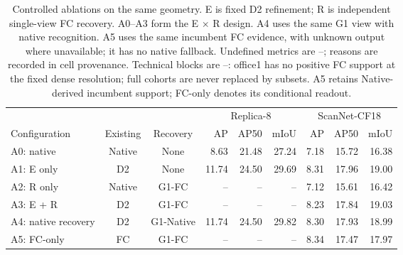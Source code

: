 \begin{table}[!ht]
\centering
\caption{Controlled ablations on the same geometry. E is fixed D2 refinement; R is independent single-view FC recovery. A0--A3 form the E $\times$ R design. A4 uses the same G1 view with native recognition. A5 uses the same incumbent FC evidence, with unknown output where unavailable; it has no native fallback. Undefined metrics are --; reasons are recorded in cell provenance. Technical blocks are --: office1 has no positive FC support at the fixed dense resolution; full cohorts are never replaced by subsets. A5 retains Native-derived incumbent support; FC-only denotes its conditional readout.}
\label{tab:ablation}
\fontsize{9}{10.5}\selectfont
\setlength{\tabcolsep}{4pt}
\begin{tabular*}{\textwidth}{@{\extracolsep{\fill}}lccrrrrrr@{}}
\toprule
& & & \multicolumn{3}{c}{Replica-8} & \multicolumn{3}{c}{ScanNet-CF18} \\
\cmidrule(lr){4-6}\cmidrule(l){7-9}
Configuration & Existing & Recovery & AP & AP50 & mIoU & AP & AP50 & mIoU \\
\midrule
A0: native & Native & None & 8.63 & 21.48 & 27.24 & 7.18 & 15.72 & 16.38 \\
A1: E only & D2 & None & 11.74 & 24.50 & 29.69 & 8.31 & 17.96 & 19.00 \\
A2: R only & Native & G1-FC & -- & -- & -- & 7.12 & 15.61 & 16.42 \\
A3: E + R & D2 & G1-FC & -- & -- & -- & 8.23 & 17.84 & 19.03 \\
\midrule
A4: native recovery & D2 & G1-Native & 11.74 & 24.50 & 29.82 & 8.30 & 17.93 & 18.99 \\
A5: FC-only & FC & G1-FC & -- & -- & -- & 8.34 & 17.47 & 17.97 \\
\bottomrule
\end{tabular*}
\end{table}
